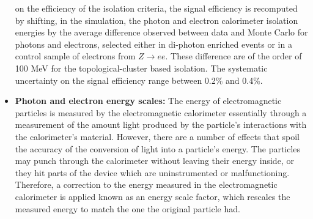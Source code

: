\begin{itemize}
on the efficiency of the isolation criteria, the signal efficiency is recomputed
by shifting, in the simulation, the photon and electron calorimeter isolation
energies by the average difference observed between data and Monte Carlo for
photons and electrons, selected either in di-photon enriched events or
in a control sample of electrons from $Z \to ee$. These difference are of the
order of 100 MeV for the topological-cluster based isolation. The systematic
uncertainty on the signal efficiency range between 0.2\% and 0.4\%.
%
\item \textbf{Photon and electron energy scales:}
The energy of electromagnetic particles is measured by the electromagnetic 
calorimeter essentially through a measurement of the amount light produced by
the particle's interactions with the calorimeter's material. However, there
are a number of effects that spoil the accuracy of the conversion of light into
a particle's energy. The particles may punch through the calorimeter without leaving
their energy inside, or they hit parts of the device which are uninstrumented or
malfunctioning. Therefore, a correction to the energy measured in the 
electromagnetic calorimeter is applied known as an energy scale factor, which
rescales the measured energy to match the one the original particle had.


\end{itemize}
